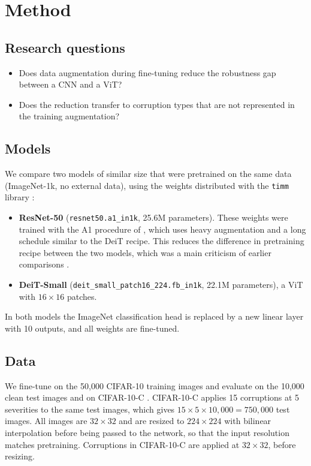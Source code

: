 \documentclass[a4paper,11pt]{article}
\begin{document}
\section{Method}
\label{sec:method}

\subsection{Research questions}
\begin{itemize}
\item[\textbf{RQ1}] Does data augmentation during fine-tuning reduce the robustness gap between a CNN and a ViT?
\item[\textbf{RQ2}] Does the reduction transfer to corruption types that are not represented in the training augmentation?
\end{itemize}

\subsection{Models}
We compare two models of similar size that were pretrained on the same data (ImageNet-1k, no external data), using the weights distributed with the \texttt{timm} library \cite{wightman2019timm}:
\begin{itemize}
\item \textbf{ResNet-50} \cite{he2016deep} (\texttt{resnet50.a1\_in1k}, 25.6M parameters). These weights were trained with the A1 procedure of \cite{wightman2021resnet}, which uses heavy augmentation and a long schedule similar to the DeiT recipe. This reduces the difference in pretraining recipe between the two models, which was a main criticism of earlier comparisons \cite{bai2021transformers}.
\item \textbf{DeiT-Small} \cite{touvron2021training} (\texttt{deit\_small\_patch16\_224.fb\_in1k}, 22.1M parameters), a ViT with $16\times16$ patches.
\end{itemize}
In both models the ImageNet classification head is replaced by a new linear layer with 10 outputs, and all weights are fine-tuned.

\subsection{Data}
We fine-tune on the 50{,}000 CIFAR-10 training images \cite{krizhevsky2009learning} and evaluate on the 10{,}000 clean test images and on CIFAR-10-C \cite{hendrycks2019benchmarking}. CIFAR-10-C applies 15 corruptions at 5 severities to the same test images, which gives $15\times5\times10{,}000=750{,}000$ test images. All images are $32\times32$ and are resized to $224\times224$ with bilinear interpolation before being passed to the network, so that the input resolution matches pretraining. Corruptions in CIFAR-10-C are applied at $32\times32$, before resizing.
\end{document}
